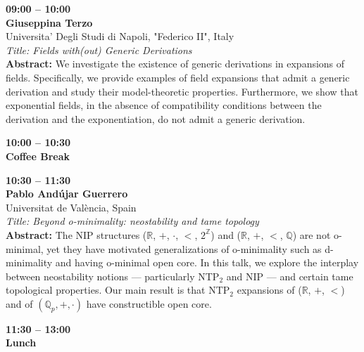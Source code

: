 \documentclass[10pt,a4paper]{article}
\begin{document}
\begin{tcolorbox}[talkbox]
\textbf{09:00 -- 10:00} \\
\textbf{Giuseppina Terzo} \\
Universita' Degli Studi di Napoli, "Federico II", Italy \\
\textit{Title: Fields with(out) Generic Derivations} \\
\textbf{Abstract:} We investigate the existence of generic derivations in expansions of fields. Specifically, we provide examples of field expansions that admit a generic derivation and study their model-theoretic properties. Furthermore, we show that exponential fields, in the absence of compatibility conditions between the derivation and the exponentiation, do not admit a generic derivation.
\end{tcolorbox}

\begin{tcolorbox}[talkbox]
\textbf{10:00 -- 10:30} \\
\textbf{Coffee Break}
\end{tcolorbox}

\begin{tcolorbox}[talkbox]
\textbf{10:30 -- 11:30} \\
\textbf{Pablo Andújar Guerrero} \\
Universitat de València, Spain \\
\textit{Title: Beyond o-minimality: neostability and tame topology} \\
\textbf{Abstract:} The NIP structures ($\mathbb{R}$, $+$, $\cdot$, $<$, $2^\mathbb{Z}$) and ($\mathbb{R}$, $+$, $<$, $\mathbb{Q}$) are not o-minimal, yet they have motivated generalizations of o-minimality such as d-minimality and having o-minimal open core. In this talk, we explore the interplay between neostability notions --- particularly NTP$_2$ and NIP --- and certain tame topological properties. Our main result is that NTP$_2$ expansions of ($\mathbb{R}$, $+$, $<$) and of $(\mathbb{Q}_p, +, \cdot)$ have constructible open core.
\end{tcolorbox}

\begin{tcolorbox}[talkbox]
\textbf{11:30 -- 13:00} \\
\textbf{Lunch}
\end{tcolorbox}
\end{document}
